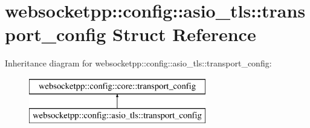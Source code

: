 \hypertarget{structwebsocketpp_1_1config_1_1asio__tls_1_1transport__config}{}\section{websocketpp\+:\+:config\+:\+:asio\+\_\+tls\+:\+:transport\+\_\+config Struct Reference}
\label{structwebsocketpp_1_1config_1_1asio__tls_1_1transport__config}
Inheritance diagram for websocketpp\+:\+:config\+:\+:asio\+\_\+tls\+:\+:transport\+\_\+config\+:\begin{figure}[H]
\begin{center}
\leavevmode
\includegraphics[height=2.000000cm]{structwebsocketpp_1_1config_1_1asio__tls_1_1transport__config}
\end{center}
\end{figure}
